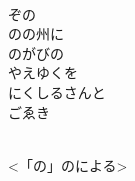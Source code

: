 \documentclass[10pt,b5j]{tarticle} %
\begin{document}
\begin{enumerate}
\begin{minipage}[c]{\blocksize}
        \vspace{\linespace}
        \item~\\
        ぞの\\
        のの州に\\
        のがびの\\
        やえゆくを\\
        にくしるさんと\\
        ごゑき
        
    \end{minipage}
    \begin{minipage}[c]{\blocksize}
        
        \vspace{\linespace}
        \item~\\
        <「の」のによる>
    
    \end{minipage}
\end{enumerate} %
\end{document}
